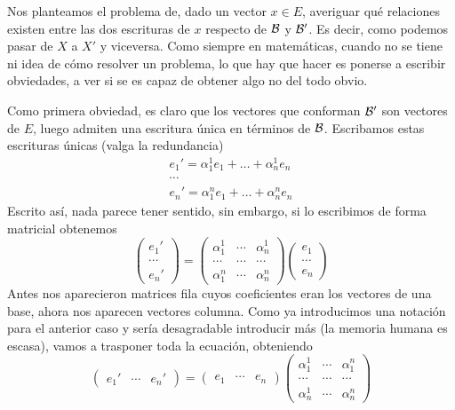 Nos planteamos el problema de, dado un vector $x\in E$, averiguar qué relaciones existen entre las dos escrituras de $x$ respecto de $\mathcal{B}$ y $\mathcal{B'}$. Es decir, como podemos pasar de $X$ a $X'$ y viceversa. Como siempre en matemáticas, cuando no se tiene ni idea de cómo resolver un problema, lo que hay que hacer es ponerse a escribir obviedades, a ver si se es capaz de obtener algo no del todo obvio.

Como primera obviedad, es claro que los vectores que conforman $\mathcal{B}'$ son vectores de $E$, luego admiten una escritura única en términos de $\mathcal{B}$. Escribamos estas escrituras únicas (valga la redundancia)
\begin{equation*}
	\begin{array}{c}
		e_1' = \alpha_1^1e_1 +\dots+\alpha_n^1e_n\\
		\cdots\\
		e_n' = \alpha_1^ne_1 +\dots+\alpha_n^ne_n
	\end{array}
\end{equation*}
Escrito así, nada parece tener sentido, sin embargo, si lo escribimos de forma matricial obtenemos
\begin{equation*}
	\begin{pmatrix}
	e_1'\\
	\cdots\\
	e_n'
	\end{pmatrix}=\begin{pmatrix}
	\alpha_1^1 & \cdots & \alpha_n^1\\
	\cdots & \cdots & \cdots\\
	\alpha_1^n & \cdots & \alpha_n^n
	\end{pmatrix}\begin{pmatrix}
	e_1\\
	\cdots\\
	e_n
	\end{pmatrix}
\end{equation*}
Antes nos aparecieron matrices fila cuyos coeficientes eran los vectores de una base, ahora nos aparecen vectores columna. Como ya introducimos una notación para el anterior caso y sería desagradable introducir más (la memoria humana es escasa), vamos a trasponer toda la ecuación, obteniendo
\begin{equation*}
	\begin{pmatrix}
	e_1' & \cdots & e_n'
	\end{pmatrix}=\begin{pmatrix}
	e_1 & \cdots & e_n
	\end{pmatrix}\begin{pmatrix}
	\alpha_1^1 & \cdots & \alpha_1^n\\
	\cdots & \cdots & \cdots\\
	\alpha_n^1 & \cdots & \alpha_n^n
	\end{pmatrix}
\end{equation*}
